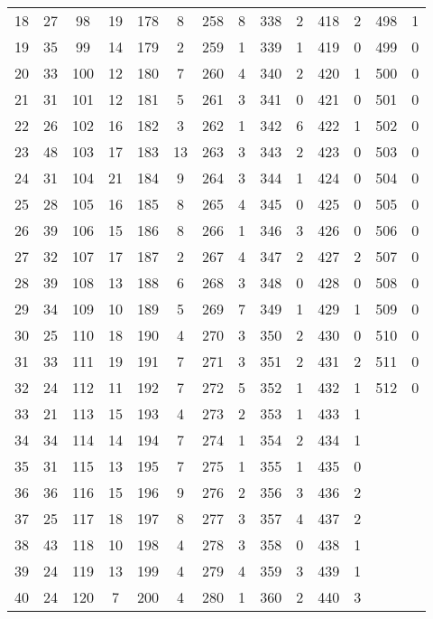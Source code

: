 \begin{table}
\begin{tabular}{c|c||c|c||c|c||c|c||c|c||c|c||c|c}
 18 & 27  & 98  & 19 & 178 &  8 & 258 &  8 & 338 & 2 & 418 & 2 & 498 & 1\\
 19 & 35  & 99  & 14 & 179 &  2 & 259 &  1 & 339 & 1 & 419 & 0 & 499 & 0\\
 20 & 33  & 100 & 12 & 180 &  7 & 260 &  4 & 340 & 2 & 420 & 1 & 500 & 0\\
 21 & 31  & 101 & 12 & 181 &  5 & 261 &  3 & 341 & 0 & 421 & 0 & 501 & 0\\
 22 & 26  & 102 & 16 & 182 &  3 & 262 &  1 & 342 & 6 & 422 & 1 & 502 & 0\\
 23 & 48  & 103 & 17 & 183 & 13 & 263 &  3 & 343 & 2 & 423 & 0 & 503 & 0\\
 24 & 31  & 104 & 21 & 184 &  9 & 264 &  3 & 344 & 1 & 424 & 0 & 504 & 0\\
 25 & 28  & 105 & 16 & 185 &  8 & 265 &  4 & 345 & 0 & 425 & 0 & 505 & 0\\
 26 & 39  & 106 & 15 & 186 &  8 & 266 &  1 & 346 & 3 & 426 & 0 & 506 & 0\\
 27 & 32  & 107 & 17 & 187 &  2 & 267 &  4 & 347 & 2 & 427 & 2 & 507 & 0\\
 28 & 39  & 108 & 13 & 188 &  6 & 268 &  3 & 348 & 0 & 428 & 0 & 508 & 0\\
 29 & 34  & 109 & 10 & 189 &  5 & 269 &  7 & 349 & 1 & 429 & 1 & 509 & 0\\
 30 & 25  & 110 & 18 & 190 &  4 & 270 &  3 & 350 & 2 & 430 & 0 & 510 & 0\\
 31 & 33  & 111 & 19 & 191 &  7 & 271 &  3 & 351 & 2 & 431 & 2 & 511 & 0\\
 32 & 24  & 112 & 11 & 192 &  7 & 272 &  5 & 352 & 1 & 432 & 1 & 512 & 0\\
 33 & 21  & 113 & 15 & 193 &  4 & 273 &  2 & 353 & 1 & 433 & 1 &     &  \\
 34 & 34  & 114 & 14 & 194 &  7 & 274 &  1 & 354 & 2 & 434 & 1 &     &  \\
 35 & 31  & 115 & 13 & 195 &  7 & 275 &  1 & 355 & 1 & 435 & 0 &     &  \\
 36 & 36  & 116 & 15 & 196 &  9 & 276 &  2 & 356 & 3 & 436 & 2 &     &  \\
 37 & 25  & 117 & 18 & 197 &  8 & 277 &  3 & 357 & 4 & 437 & 2 &     &  \\
 38 & 43  & 118 & 10 & 198 &  4 & 278 &  3 & 358 & 0 & 438 & 1 &     &  \\
 39 & 24  & 119 & 13 & 199 &  4 & 279 &  4 & 359 & 3 & 439 & 1 &     &  \\
 40 & 24  & 120 &  7 & 200 &  4 & 280 &  1 & 360 & 2 & 440 & 3 &     &  \\
 \bottomrule
 \end{tabular}
 \end{table}

